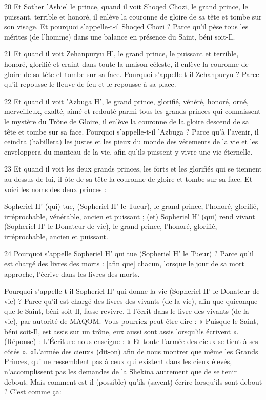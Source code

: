 \par 20 Et Sother 'Ashiel le prince, quand il voit Shoqed Chozi, le grand prince, le puissant, terrible et honoré, il enlève la couronne de gloire de sa tête et tombe sur son visage. Et pourquoi s'appelle-t-il Shoqed Chozi ? Parce qu'il pèse tous les mérites (de l'homme) dans une balance en présence du Saint, béni soit-Il.

\par 21 Et quand il voit Zehanpuryu H', le grand prince, le puissant et terrible, honoré, glorifié et craint dans toute la maison céleste, il enlève la couronne de gloire de sa tête et tombe sur sa face. Pourquoi s'appelle-t-il Zehanpuryu ? Parce qu'il repousse le fleuve de feu et le repousse à sa place.

\par 22 Et quand il voit 'Azbuga H', le grand prince, glorifié, vénéré, honoré, orné, merveilleux, exalté, aimé et redouté parmi tous les grands princes qui connaissent le mystère du Trône de Gloire, il enlève la couronne de la gloire descend de sa tête et tombe sur sa face. Pourquoi s'appelle-t-il 'Azbuga ? Parce qu'à l'avenir, il ceindra (habillera) les justes et les pieux du monde des vêtements de la vie et les enveloppera du manteau de la vie, afin qu'ils puissent y vivre une vie éternelle.

\par 23 Et quand il voit les deux grands princes, les forts et les glorifiés qui se tiennent au-dessus de lui, il ôte de sa tête la couronne de gloire et tombe sur sa face. Et voici les noms des deux princes :

\par Sopheriel H' (qui) tue, (Sopheriel H' le Tueur), le grand prince, l'honoré, glorifié, irréprochable, vénérable, ancien et puissant ; (et) Sopheriel H' (qui) rend vivant (Sopheriel H' le Donateur de vie), le grand prince, l'honoré, glorifié, irréprochable, ancien et puissant.

\par 24 Pourquoi s'appelle Sopheriel H' qui tue (Sopheriel H' le Tueur) ? Parce qu'il est chargé des livres des morts : [afin que] chacun, lorsque le jour de sa mort approche, l'écrive dans les livres des morts.

\par Pourquoi s'appelle-t-il Sopheriel H' qui donne la vie (Sopheriel H' le Donateur de vie) ? Parce qu'il est chargé des livres des vivants (de la vie), afin que quiconque que le Saint, béni soit-Il, fasse revivre, il l'écrit dans le livre des vivants (de la vie), par autorité de MAQOM. Vous pourriez peut-être dire : « Puisque le Saint, béni soit-Il, est assis sur un trône, eux aussi sont assis lorsqu'ils écrivent ». (Réponse) : L'Écriture nous enseigne : « Et toute l'armée des cieux se tient à ses côtés ». «L'armée des cieux» (dit-on) afin de nous montrer que même les Grands Princes, qui ne ressemblent pas à ceux qui existent dans les cieux élevés, n'accomplissent pas les demandes de la Shekina autrement que de se tenir debout. Mais comment est-il (possible) qu’ils (savent) écrire lorsqu’ils sont debout ? C'est comme ça:

